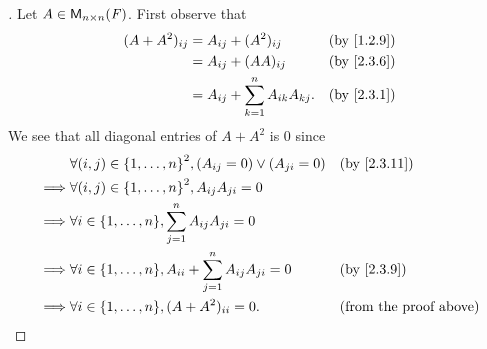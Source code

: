 \begin{proof}[]
	Let \(A \in \mathsf{M}_{{n} \times n}({\mathit{F}})\).
	First observe that
	\begin{align*}
		(A + A^2)_{i j} & = A_{i j} + (A^2)_{i j}                     &  & \by{1.2.9} \\
		                & = A_{i j} + (AA)_{i j}                      &  & \by{2.3.6} \\
		                & = A_{i j} + \sum_{k = 1}^n A_{i k} A_{k j}. &  & \by{2.3.1}
	\end{align*}
	We see that all diagonal entries of \(A + A^2\) is \(0\) since
	\begin{align*}
		         & \forall (i, j) \in \set{1, \dots, n}^2, (A_{i j} = 0) \lor (A_{j i} = 0)      &  & \by{2.3.11}                   \\
		\implies & \forall (i, j) \in \set{1, \dots, n}^2, A_{i j} A_{j i} = 0                                                      \\
		\implies & \forall i \in \set{1, \dots, n}, \sum_{j = 1}^n A_{i j} A_{j i} = 0                                              \\
		\implies & \forall i \in \set{1, \dots, n}, A_{i i} + \sum_{j = 1}^n A_{i j} A_{j i} = 0 &  & \by{2.3.9}                    \\
		\implies & \forall i \in \set{1, \dots, n}, (A + A^2)_{i i} = 0.                         &  & \text{(from the proof above)}
	\end{align*}


\end{proof}
